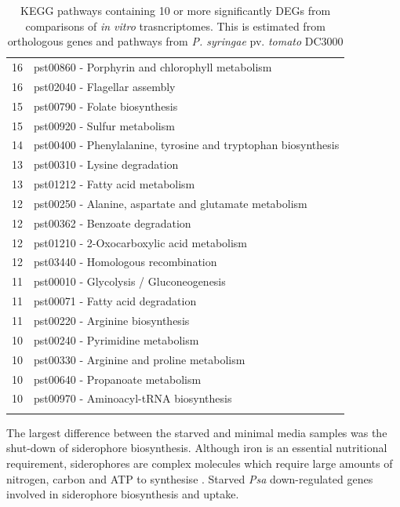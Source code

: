 {\begin{longtable}{cl}
16  & pst00860 - Porphyrin and chlorophyll metabolism \\ 
16  & pst02040 - Flagellar assembly \\ 
15  & pst00790 - Folate biosynthesis \\ 
15  & pst00920 - Sulfur metabolism \\ 
14  & pst00400 - Phenylalanine, tyrosine and tryptophan biosynthesis \\ 
13  & pst00310 - Lysine degradation \\ 
13  & pst01212 - Fatty acid metabolism \\ 
12  & pst00250 - Alanine, aspartate and glutamate metabolism \\ 
12  & pst00362 - Benzoate degradation \\ 
12  & pst01210 - 2-Oxocarboxylic acid metabolism \\ 
12  & pst03440 - Homologous recombination \\ 
11  & pst00010 - Glycolysis / Gluconeogenesis \\ 
11  & pst00071 - Fatty acid degradation \\ 
11  & pst00220 - Arginine biosynthesis \\ 
10  & pst00240 - Pyrimidine metabolism \\ 
10  & pst00330 - Arginine and proline metabolism \\ 
10  & pst00640 - Propanoate metabolism \\ 
10  & pst00970 - Aminoacyl-tRNA biosynthesis \\ 
    \bottomrule
    \caption[KEGG pathways containing 10 or more significantly DEGs]{KEGG pathways containing 10 or more significantly DEGs from comparisons of \textit{in vitro} trasncriptomes. This is estimated from orthologous genes and pathways from \textit{P. syringae} pv. \textit{tomato} DC3000}
\end{longtable}}

The largest difference between the starved and minimal media samples was the shut-down of siderophore biosynthesis. Although iron is an essential nutritional requirement, siderophores are complex molecules which require large amounts of nitrogen, carbon and ATP to synthesise \citep{Sexton2017-zh}. Starved \textit{Psa} down-regulated genes involved in siderophore biosynthesis and uptake.
\newline

